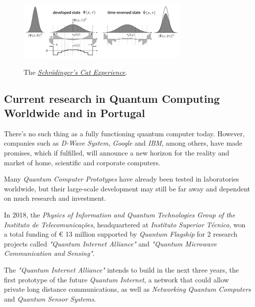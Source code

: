 \documentclass[conference]{IEEEtran}
\begin{document}
\begin{center}
  \begin{figure}[htbp]
    \centerline{\href{https://en.wikipedia.org/wiki/Schr\%C3\%B6dinger\%27s_cat}{\includegraphics{imgs/fig-1.png}}}
    \caption{The \href{https://en.wikipedia.org/wiki/Schr\%C3\%B6dinger\%27s_cat}{\textit{Schr\"odinger's Cat Experience}}.}
    \label{fig}
  \end{figure}
\end{center}

\vspace{4pt}

\subsection{Current research in Quantum Computing Worldwide and in Portugal}\label{AA}

There's no such thing as a fully functioning quantum computer today. However, companies such as \textit{D-Wave System}, \textit{Google} and \textit{IBM}, among others, have made promises, which if fulfilled, will announce a new horizon for the reality and market of home, scientific and corporate computers.

\vspace{4pt}

Many \textit{Quantum Computer Prototypes} have already been tested in laboratories worldwide, but their large-scale development may still be far away and dependent on much research and investment.

\vspace{4pt}

In 2018, the \textit{Physics of Information and Quantum Technologies Group of the Instituto de Telecomunica\c{c}\"oes}, headquartered at \textit{Instituto Superior T\'ecnico}, won a total funding of \euro\hspace{0.05mm} 13 million supported by \textit{Quantum Flagship} for 2 research projects called \textit{"Quantum Internet Alliance"} and \textit{"Quantum Microwave Communication and Sensing"}.

\newpage

The \textit{"Quantum Internet Alliance"} intends to build in the next three years, the first prototype of the future \textit{Quantum Internet}, a network that could allow private long distance communications, as well as \textit{Networking Quantum Computers} and \textit{Quantum Sensor Systems}.
\end{document}
